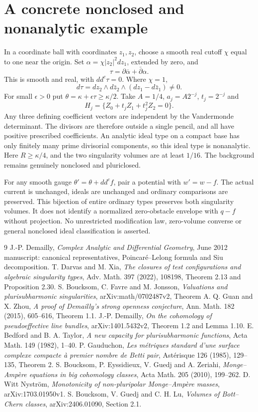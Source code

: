 \documentclass[11pt]{article}
\newcommand{\ddc}{dd^c}
\theoremstyle{remark}\newtheorem{remark}[theorem]{Remark}
\begin{document}
\section{A concrete nonclosed and nonanalytic example}
In a coordinate ball with coordinates $z_1,z_2$, choose a smooth
real cutoff $\chi$ equal to one near the origin. Set
$\alpha=\chi|z_2|^2dz_1$, extended by zero, and
\[
 \tau=\partial\overline\alpha+\bar\partial\alpha.
\]
This is smooth and real, with $\ddc\tau=0$. Where $\chi=1$,
\[
 d\tau=dz_2\wedge d\bar z_2\wedge(dz_1-d\bar z_1)\ne0.
\]
For small $\epsilon>0$ put
$\theta=\kappa+\epsilon\tau\geq\kappa/2$.
Take $A=1/4$, $a_j=A2^{-j}$, $t_j=2^{-j}$ and
\[
 H_j=\{Z_0+t_jZ_1+t_j^2Z_2=0\}.
\]
Any three defining coefficient vectors are independent by the
Vandermonde determinant. The divisors are therefore outside a
single pencil, and all have positive prescribed coefficients.
An analytic ideal type on a compact base has only finitely many
prime divisorial components, so this ideal type is nonanalytic.
Here $R\geq\kappa/4$, and the two singularity volumes are at least
$1/16$. The background remains genuinely nonclosed and pluriclosed.

For any smooth gauge $\theta'=\theta+\ddc f$, pair a potential with
$w'=w-f$. The actual current is unchanged, ideals are unchanged and
ordinary comparisons are preserved. This bijection of entire ordinary
types preserves both singularity volumes. It does not identify a
normalized zero-obstacle envelope with $q-f$ without projection.
No unrestricted modification law, zero-volume converse or general
nonclosed ideal classification is asserted.

\begin{thebibliography}{9}
 J.-P. Demailly, \emph{Complex Analytic and Differential
Geometry}, June 2012 manuscript: canonical representatives,
Poincar\'e--Lelong formula and Siu decomposition.
 T. Darvas and M. Xia, \emph{The closures of test
configurations and algebraic singularity types}, Adv. Math. 397 (2022),
108198, Theorem 2.13 and Proposition 2.30.
 S. Boucksom, C. Favre and M. Jonsson,
\emph{Valuations and plurisubharmonic singularities},
arXiv:math/0702487v2, Theorem A.
 Q. Guan and X. Zhou,
\emph{A proof of Demailly's strong openness conjecture},
Ann. Math. 182 (2015), 605--616, Theorem 1.1.
 J.-P. Demailly, \emph{On the cohomology of pseudoeffective
line bundles}, arXiv:1401.5432v2, Theorem 1.2 and Lemma 1.10.
 E. Bedford and B. A. Taylor, \emph{A new capacity for
plurisubharmonic functions}, Acta Math. 149 (1982), 1--40.
 P. Gauduchon, \emph{Les m\'etriques standard d'une surface
complexe compacte \`a premier nombre de Betti pair}, Ast\'erisque 126
(1985), 129--135, Theorem 2.
 S. Boucksom, P. Eyssidieux, V. Guedj and A. Zeriahi,
\emph{Monge--Amp\`ere equations in big cohomology classes},
Acta Math. 205 (2010), 199--262.
 D. Witt Nystr\"om, \emph{Monotonicity of non-pluripolar
Monge--Amp\`ere masses}, arXiv:1703.01950v1.
 S. Boucksom, V. Guedj and C. H. Lu,
\emph{Volumes of Bott--Chern classes}, arXiv:2406.01090, Section 2.1.
\end{thebibliography}
\end{document}
